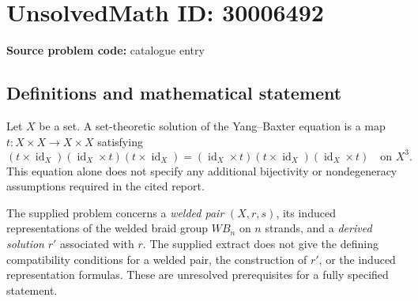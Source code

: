 \documentclass[11pt]{article}
\begin{document}
\section*{UnsolvedMath ID: 30006492}
\textbf{Source problem code:} catalogue entry
\subsection{Definitions and mathematical statement}
Let \(X\) be a set. A set-theoretic solution of the Yang--Baxter equation is a map \(t\colon X\times X\to X\times X\) satisfying
\[
(t\times\operatorname{id}_X)(\operatorname{id}_X\times t)(t\times\operatorname{id}_X)
=
(\operatorname{id}_X\times t)(t\times\operatorname{id}_X)(\operatorname{id}_X\times t)
\quad\text{on }X^3.
\]
This equation alone does not specify any additional bijectivity or nondegeneracy assumptions required in the cited report.

The supplied problem concerns a \emph{welded pair} \((X,r,s)\), its induced representations of the welded braid group \(WB_n\) on \(n\) strands, and a \emph{derived solution} \(r'\) associated with \(r\). The supplied extract does not give the defining compatibility conditions for a welded pair, the construction of \(r'\), or the induced representation formulas. These are unresolved prerequisites for a fully specified statement.
\end{document}
